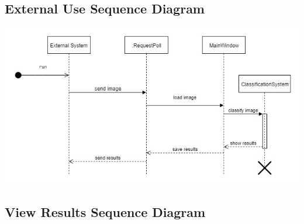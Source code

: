 \documentclass[parskip=full]{scrartcl}
\begin{document}
\pagebreak

\subsection {External Use Sequence Diagram}

\begin{center}
\includegraphics[angle=90,origin=c,height=1.0\textwidth]{Untitled Diagram.jpg}
\end{center}

\pagebreak

\subsection {View Results Sequence Diagram}
\end{document}
